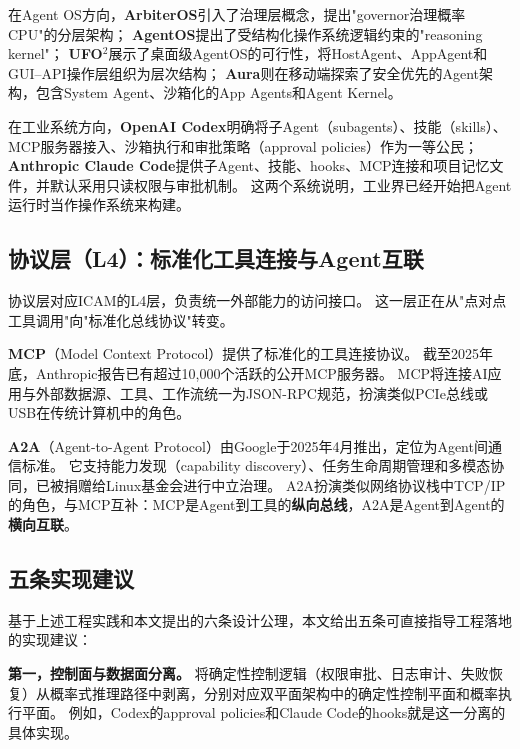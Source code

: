 在Agent OS方向，\textbf{ArbiterOS}引入了治理层概念，提出"governor治理概率CPU"的分层架构\cite{arbiteros2025}；
\textbf{AgentOS}提出了受结构化操作系统逻辑约束的"reasoning kernel"\cite{agentos2025}；
\textbf{UFO$^2$}展示了桌面级AgentOS的可行性，将HostAgent、AppAgent和GUI--API操作层组织为层次结构\cite{ufo2_2025}；
\textbf{Aura}则在移动端探索了安全优先的Agent架构，包含System Agent、沙箱化的App Agents和Agent Kernel\cite{aura2025}。

在工业系统方向，\textbf{OpenAI Codex}明确将子Agent（subagents）、技能（skills）、MCP服务器接入、沙箱执行和审批策略（approval policies）作为一等公民\cite{openai_codex_overview_2026,openai_codex_subagents_2026,openai_codex_skills_2026,openai_codex_sandbox_2026,openai_codex_approvals_2026}；
\textbf{Anthropic Claude Code}提供子Agent、技能、hooks、MCP连接和项目记忆文件，并默认采用只读权限与审批机制\cite{anthropic_claudecode_overview_2026,anthropic_claudecode_security_2026}。
这两个系统说明，工业界已经开始把Agent运行时当作操作系统来构建。

\subsection{协议层（L4）：标准化工具连接与Agent互联}

协议层对应ICAM的L4层，负责统一外部能力的访问接口。
这一层正在从"点对点工具调用"向"标准化总线协议"转变。

\textbf{MCP}（Model Context Protocol）提供了标准化的工具连接协议\cite{mcp_intro_2026}。
截至2025年底，Anthropic报告已有超过10{,}000个活跃的公开MCP服务器\cite{mcpadoption2026}。
MCP将连接AI应用与外部数据源、工具、工作流统一为JSON-RPC规范，扮演类似PCIe总线或USB在传统计算机中的角色。

\textbf{A2A}（Agent-to-Agent Protocol）由Google于2025年4月推出，定位为Agent间通信标准\cite{google_a2a_2025,agentprotocols2025}。
它支持能力发现（capability discovery）、任务生命周期管理和多模态协同，已被捐赠给Linux基金会进行中立治理\cite{a2alinux2025}。
A2A扮演类似网络协议栈中TCP/IP的角色，与MCP互补：MCP是Agent到工具的\textbf{纵向总线}，A2A是Agent到Agent的\textbf{横向互联}。

\subsection{五条实现建议}

基于上述工程实践和本文提出的六条设计公理，本文给出五条可直接指导工程落地的实现建议：

\textbf{第一，控制面与数据面分离。}
将确定性控制逻辑（权限审批、日志审计、失败恢复）从概率式推理路径中剥离，分别对应双平面架构中的确定性控制平面和概率执行平面。
例如，Codex的approval policies和Claude Code的hooks就是这一分离的具体实现\cite{openai_codex_approvals_2026,anthropic_claudecode_security_2026}。

